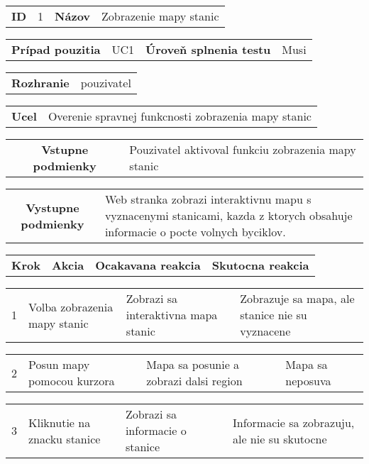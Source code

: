 \begin{table}[h]
  \centering
  \begin{tabularx}{\mytablewidth}{|c|c|c|X|} 
      \hline 
      \textbf{ID} & 1 & \textbf{Názov} & Zobrazenie mapy stanic 
  \end{tabularx}

  \begin{tabularx}{\mytablewidth}{|c|c|c|X|} 
      \hline 
      \textbf{Prípad pouzitia} & UC1 & \textbf{Úroveň splnenia testu} & Musi
  \end{tabularx}

  \begin{tabularx}{\mytablewidth}{|c|X|} 
      \hline 
      \textbf{Rozhranie} & pouzivatel
  \end{tabularx}

  \begin{tabularx}{\mytablewidth}{|c|X|} 
      \hline 
      \textbf{Ucel} & Overenie spravnej funkcnosti zobrazenia mapy stanic
  \end{tabularx}

  \begin{tabularx}{\mytablewidth}{|c|X|} 
      \hline 
      \textbf{Vstupne podmienky} & Pouzivatel aktivoval funkciu zobrazenia mapy stanic
  \end{tabularx}

  \begin{tabularx}{\mytablewidth}{|c|X|} 
      \hline 
      \textbf{Vystupne podmienky} & Web stranka zobrazi interaktivnu mapu s vyznacenymi stanicami,
      kazda z ktorych obsahuje informacie o pocte volnych byciklov.
  \end{tabularx}

  \begin{tabularx}{\mytablewidth}{|p{2em}|X|X|X|} 
      \hline 
      \textbf{Krok} & \textbf{Akcia} & \textbf{Ocakavana reakcia} & \textbf{Skutocna reakcia}
  \end{tabularx}

  \begin{tabularx}{\mytablewidth}{|p{2em}|X|X|X|} 
      \hline 
      1 & 
      Volba zobrazenia mapy stanic & 
      Zobrazi sa interaktivna mapa stanic & 
      Zobrazuje sa mapa, ale stanice nie su vyznacene
  \end{tabularx}
  \begin{tabularx}{\mytablewidth}{|p{2em}|X|X|X|} 
      \hline 
      2 & 
      Posun mapy pomocou kurzora & 
      Mapa sa posunie a zobrazi dalsi region & 
      Mapa sa neposuva
  \end{tabularx}
  \begin{tabularx}{\mytablewidth}{|p{2em}|X|X|X|} 
      \hline 
      3 & 
      Kliknutie na znacku stanice & 
      Zobrazi sa informacie o stanice & 
      Informacie sa zobrazuju, ale nie su skutocne
  \end{tabularx}
  \begin{tabularx}{\mytablewidth}{|X|} 
      \hline
  \end{tabularx}
\end{table}
